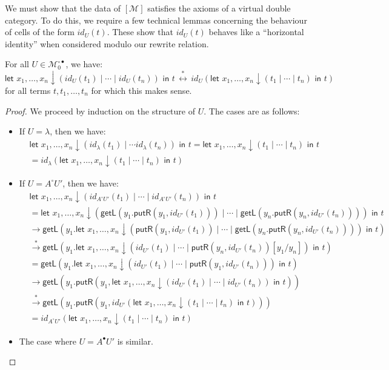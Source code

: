 \documentclass[twoside,11pt,final]{entics}
\newcommand{\getl}{\mathsf{getL}}
\newcommand{\putr}{\mathsf{putR}}
\newcommand{\ex}[1]{{#1}^{\circ\bullet}}
\newcommand{\asn}{\downarrow}
\newcommand{\seq}{,\!\ldots\!,}
\begin{document}
We must show that the data of $[\mathcal{M}]$ satisfies the axioms of a virtual double category. To do this, we require a few technical lemmas concerning the behaviour of cells of the form $id_U(t)$. These show that $id_U(t)$ behaves like a ``horizontal identity'' when considered modulo our rewrite relation.
\begin{lemma}\label{lem:id-pop}
  For all $U \in \ex{\mathcal{M}}_0$, we have:
  \[
    \textsf{let } x_1 \seq x_n \asn (id_U(t_1) \mid \cdots \mid id_U(t_n)) \textsf{ in } t
    \,\stackrel{*}{\leftrightarrow}\, 
    id_U(\textsf{let } x_1 \seq x_n \asn (t_1 \mid \cdots \mid t_n) \textsf{ in } t)
  \]
  for all terms $t,t_1,\ldots,t_n$ for which this makes sense.
\end{lemma}
\begin{proof}
  We proceed by induction on the structure of $U$. The cases are as follows:
  \begin{itemize}
  \item If $U = \lambda$, then we have:
    \begin{align*}
      & \textsf{let } x_1 \seq x_n \asn (id_\lambda(t_1) \mid \cdots id_\lambda(t_n)) \textsf{ in } t
        = \textsf{let } x_1 \seq x_n \asn  (t_1 \mid \cdots \mid t_n) \textsf{ in } t
        \\&= id_\lambda(\textsf{let } x_1 \seq x_n \asn (t_1 \mid \cdots \mid t_n) \textsf{ in } t)
    \end{align*}
  \item If $U = A^\circ U'$, then we have:
    \begin{align*}
      & \textsf{let } x_1 \seq x_n \asn (id_{A^\circ U'}(t_1) \mid \cdots \mid id_{A^\circ U'}(t_n)) \textsf{ in } t
      \\& = \textsf{let } x_1 \seq x_n \asn (\getl(y_1. \putr(y_1, id_{U'}(t_1))) \mid \cdots \mid \getl(y_n.\putr(y_n,id_{U'}(t_n)))) \textsf{ in } t
      \\& \to \getl(y_1. \textsf{let } x_1 \seq x_n \asn ( \putr(y_1, id_{U'}(t_1)) \mid \cdots \mid \getl(y_n.\putr(y_n,id_{U'}(t_n)))) \textsf{ in } t)
      \\& \stackrel{*}{\to} \getl(y_1. \textsf{let } x_1 \seq x_n \asn (id_{U'}(t_1) \mid \cdots \mid \putr(y_n,id_{U'}(t_n))[y_1/y_n]) \textsf{ in } t)
      \\&= \getl(y_1. \textsf{let } x_1 \seq x_n \asn (id_{U'}(t_1) \mid \cdots \mid \putr(y_1,id_{U'}(t_n))) \textsf{ in } t)
      \\& \to \getl(y_1. \putr(y_1, \textsf{let } x_1 \seq x_n \asn (id_{U'}(t_1) \mid \cdots \mid id_{U'}(t_n)) \textsf{ in } t))
      \\& \stackrel{*}{\to} \getl(y_1. \putr(y_1, id_{U'}(\textsf{let } x_1 \seq x_n \asn (t_1 \mid \cdots \mid t_n) \textsf{ in } t)))
      \\& = id_{A^\circ U'}(\textsf{let } x_1 \seq x_n \asn (t_1 \mid \cdots \mid t_n) \textsf{ in } t)
    \end{align*}
  \item The case where $U = A^\bullet U'$ is similar.
  \end{itemize}
\end{proof}
\end{document}
